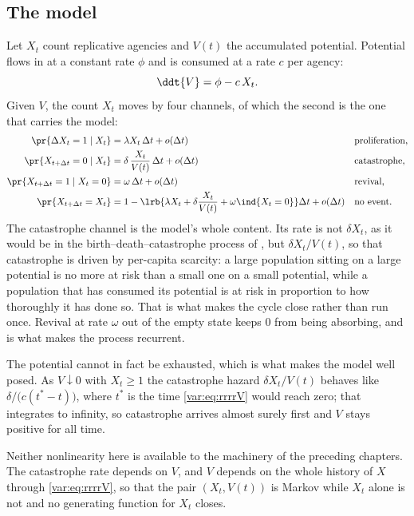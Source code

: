 \subsection{The model}
\label{var:sec:rrrrmodel}

Let $X_t$ count replicative agencies and $V(t)$ the accumulated potential.
Potential flows in at a constant rate $\phi$ and is consumed at a rate $c$
per agency:
\begin{equation}
\ddt{V}=\phi-c\,X_t .
\label{var:eq:rrrrV}
\end{equation}
Given $V$, the count $X_t$ moves by four channels, of which the second is the
one that carries the model:
\begin{align}
\pr{\Delta X_t=1\mid X_t}&=\lambda X_t\,\Delta t+o(\Delta t)
&&\text{proliferation,}\notag\\
\pr{X_{t+\Delta t}=0\mid X_t}&=\delta\,\frac{X_t}{V(t)}\,\Delta t+o(\Delta t)
&&\text{catastrophe,}\notag\\
\pr{X_{t+\Delta t}=1\mid X_t=0}&=\omega\,\Delta t+o(\Delta t)
&&\text{revival,}\label{var:eq:rrrr}\\
\pr{X_{t+\Delta t}=X_t}&=1-\lrb{\lambda X_t
+\delta\frac{X_t}{V(t)}+\omega\ind\{X_t=0\}}\Delta t+o(\Delta t)
&&\text{no event.}\notag
\end{align}
The catastrophe channel is the model's whole content. Its rate is not
$\delta X_t$, as it would be in the birth--death--catastrophe process of
\ChCore{}, but $\delta X_t/V(t)$, so that catastrophe is driven by per-capita
scarcity: a large population sitting on a large potential is no more at risk
than a small one on a small potential, while a population that has consumed
its potential is at risk in proportion to how thoroughly it has done so. That
is what makes the cycle close rather than run once. Revival at rate $\omega$
out of the empty state keeps $0$ from being absorbing, and is what makes the
process recurrent.

The potential cannot in fact be exhausted, which is what makes the model well
posed. As $V\downarrow0$ with $X_t\ge1$ the catastrophe hazard
$\delta X_t/V(t)$ behaves like $\delta/\bigl(c(t^{\ast}-t)\bigr)$, where
$t^{\ast}$ is the time \cref{var:eq:rrrrV} would reach zero; that integrates
to infinity, so catastrophe arrives almost surely first and $V$ stays positive
for all time.

Neither nonlinearity here is available to the machinery of the preceding
chapters. The catastrophe rate depends on $V$, and $V$ depends on the whole
history of $X$ through \cref{var:eq:rrrrV}, so that the pair $(X_t,V(t))$ is
Markov while $X_t$ alone is not and no generating function for $X_t$
closes.

